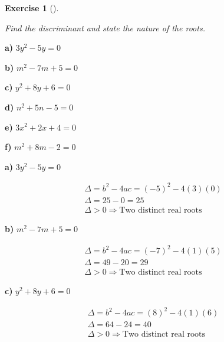\documentclass[
  letterpaper,
  DIV=11,
  numbers=noendperiod]{scrreprt}
\theoremstyle{definition}
\newtheorem{exercise}{Exercise}[chapter]
\theoremstyle{remark}
\begin{document}
\begin{exercise}[]\protect\hypertarget{exr-u6-23}{}\label{exr-u6-23}

\emph{Find the discriminant and state the nature of the roots.}

\textbf{a)} \(\displaystyle 3y^2 - 5y = 0\)

\textbf{b)} \(\displaystyle m^2 - 7m + 5 = 0\)

\textbf{c)} \(\displaystyle y^2 + 8y + 6 = 0\)

\textbf{d)} \(\displaystyle n^2 + 5n - 5 = 0\)

\textbf{e)} \(\displaystyle 3x^2 + 2x + 4 = 0\)

\textbf{f)} \(\displaystyle m^2 + 8m - 2 = 0\)

\begin{tcolorbox}[enhanced jigsaw, opacitybacktitle=0.6, coltitle=black, arc=.35mm, colframe=quarto-callout-tip-color-frame, colback=white, bottomrule=.15mm, left=2mm, colbacktitle=quarto-callout-tip-color!10!white, titlerule=0mm, opacityback=0, title=\textcolor{quarto-callout-tip-color}{\faLightbulb}\hspace{0.5em}{🔍 View Solutions}, leftrule=.75mm, breakable, rightrule=.15mm, bottomtitle=1mm, toptitle=1mm, toprule=.15mm]

\textbf{a)} \(\displaystyle 3y^2 - 5y = 0\)

\begin{align*}
\Delta = b^2 - 4ac = (-5)^2 - 4(3)(0) \\ \Delta = 25 - 0 = 25 \\ \Delta > 0 \Rightarrow \text{Two distinct real roots}
\end{align*}

\textbf{b)} \(\displaystyle m^2 - 7m + 5 = 0\)

\begin{align*}
\Delta = b^2 - 4ac = (-7)^2 - 4(1)(5) \\ \Delta = 49 - 20 = 29 \\ \Delta > 0 \Rightarrow \text{Two distinct real roots}
\end{align*}

\textbf{c)} \(\displaystyle y^2 + 8y + 6 = 0\)

\begin{align*}
\Delta = b^2 - 4ac = (8)^2 - 4(1)(6) \\ \Delta = 64 - 24 = 40 \\ \Delta > 0 \Rightarrow \text{Two distinct real roots}
\end{align*}


\end{tcolorbox}
\end{exercise}
\end{document}
